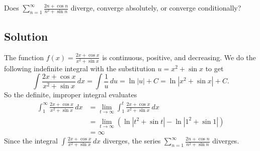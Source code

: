 \documentclass{article}
\begin{document}
\noindent
Does $\displaystyle \sum_{n=1}^\infty \frac{2n+\cos n}{n^2+\sin n}$
diverge, converge absolutely, or converge conditionally?

\subsection*{Solution}

The function $f(x)=\frac{2x+\cos x}{x^2+\sin x}$ is continuous, positive, and decreasing. We do the following indefinite integral with the substitution $u = x^2+\sin x$ to get
\[
\int \frac{2x+\cos x}{x^2+\sin x}\,dx
= \int \frac1u\,du
= \ln |u| +C 
= \ln |x^2+\sin x|+C.\]
So the definite, improper integral evaluates
\begin{align*}
\int_1^\infty \frac{2x+\cos x}{x^2+\sin x}\,dx
&= \lim_{t \to \infty} \int_1^t \frac{2x+\cos x}{x^2+\sin x}\,dx\\
&= \lim_{t \to \infty} (\ln |t^2+\sin t| - \ln |1^2+\sin 1|)\\
&= \infty
\end{align*}
Since the integral $\displaystyle \int \frac{2x+\cos x}{x^2+\sin x}\,dx$ diverges, the series $\displaystyle \sum_{n=1}^\infty \frac{2n+\cos n}{n^2+\sin n}$ diverges.
\end{document}
